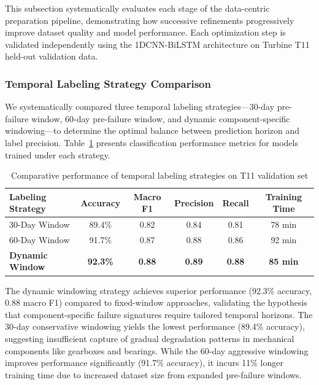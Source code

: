 \documentclass[12pt]{article}
\begin{document}
This subsection systematically evaluates each stage of the data-centric preparation pipeline, demonstrating how successive refinements progressively improve dataset quality and model performance. Each optimization step is validated independently using the 1DCNN-BiLSTM architecture on Turbine T11 held-out validation data.

\subsubsection{Temporal Labeling Strategy Comparison}

We systematically compared three temporal labeling strategies—30-day pre-failure window, 60-day pre-failure window, and dynamic component-specific windowing—to determine the optimal balance between prediction horizon and label precision. Table~\ref{tab:labeling_results} presents classification performance metrics for models trained under each strategy.

\begin{table}[htbp]
\centering
\caption{Comparative performance of temporal labeling strategies on T11 validation set}
\label{tab:labeling_results}
\begin{tabular}{lccccc}
\toprule
\textbf{Labeling Strategy} & \textbf{Accuracy} & \textbf{Macro F1} & \textbf{Precision} & \textbf{Recall} & \textbf{Training Time} \\
\midrule
30-Day Window & 89.4\% & 0.82 & 0.84 & 0.81 & 78 min \\
60-Day Window & 91.7\% & 0.87 & 0.88 & 0.86 & 92 min \\
\textbf{Dynamic Window} & \textbf{92.3\%} & \textbf{0.88} & \textbf{0.89} & \textbf{0.88} & \textbf{85 min} \\
\bottomrule
\end{tabular}
\end{table}

The dynamic windowing strategy achieves superior performance (92.3\% accuracy, 0.88 macro F1) compared to fixed-window approaches, validating the hypothesis that component-specific failure signatures require tailored temporal horizons. The 30-day conservative windowing yields the lowest performance (89.4\% accuracy), suggesting insufficient capture of gradual degradation patterns in mechanical components like gearboxes and bearings. While the 60-day aggressive windowing improves performance significantly (91.7\% accuracy), it incurs 11\% longer training time due to increased dataset size from expanded pre-failure windows.
\end{document}
